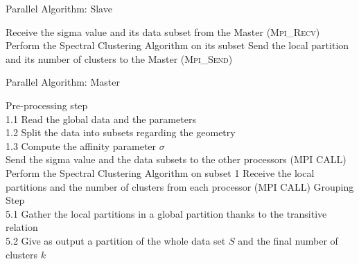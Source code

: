 \documentclass[]{svmult}
\begin{document}

\begin{algorithm}
\caption{Parallel Algorithm: Slave}
\label{algo-slave}
\begin{algorithmic}[1]
  \STATE Receive the sigma value and its data subset from the Master
         (\textsc{Mpi\_Recv})
  \STATE Perform the Spectral Clustering Algorithm on its subset
  \STATE Send the local partition and its number of clusters to the Master
         (\textsc{Mpi\_Send})
\end{algorithmic}
\end{algorithm}

\begin{algorithm}
\caption{Parallel Algorithm: Master}
\label{algo-master}
\begin{algorithmic}[1]
  \STATE Pre-processing step\\
        \hspace{0.3cm} 1.1 Read the global data and the parameters\\
        \hspace{0.3cm} 1.2 Split the data into subsets regarding the geometry\\
        \hspace{0.3cm} 1.3 Compute the affinity parameter $\sigma$\\
  \STATE Send the sigma value and the data subsets to the other processors
         (MPI CALL)
  \STATE Perform the Spectral Clustering Algorithm on subset 1
  \STATE Receive the local partitions and the number of clusters from each
         processor (MPI CALL)
  \STATE Grouping Step\\
         \hspace{0.3cm} 5.1 Gather the local partitions in a global
                        partition thanks to the transitive relation\\
         \hspace{0.3cm} 5.2 Give as output a partition of the whole data
                        set $S$ and the final number of clusters $k$
\end{algorithmic}
\end{algorithm}
\end{document}
